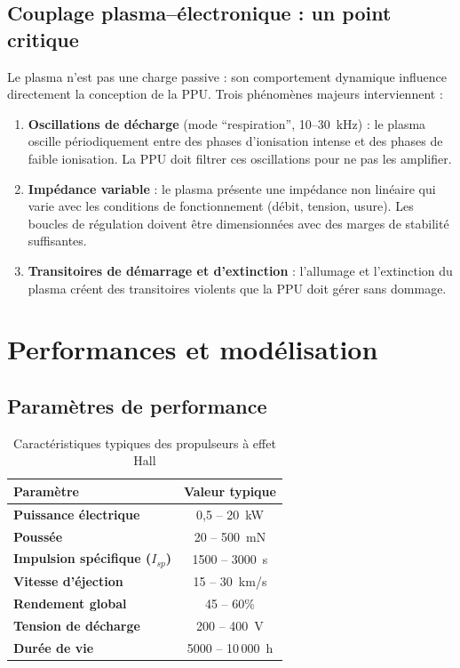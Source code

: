 \documentclass[12pt,a4paper]{article}
\begin{document}
\subsection{Couplage plasma--électronique : un point critique}

Le plasma n'est pas une charge passive : son comportement dynamique influence directement la conception de la PPU. Trois phénomènes majeurs interviennent :

\begin{enumerate}
    \item \textbf{Oscillations de décharge} (mode ``respiration'', 10--30~kHz) : le plasma oscille périodiquement entre des phases d'ionisation intense et des phases de faible ionisation. La PPU doit filtrer ces oscillations pour ne pas les amplifier.
    \item \textbf{Impédance variable} : le plasma présente une impédance non linéaire qui varie avec les conditions de fonctionnement (débit, tension, usure). Les boucles de régulation doivent être dimensionnées avec des marges de stabilité suffisantes.
    \item \textbf{Transitoires de démarrage et d'extinction} : l'allumage et l'extinction du plasma créent des transitoires violents que la PPU doit gérer sans dommage.
\end{enumerate}

\section{Performances et modélisation}

\subsection{Paramètres de performance}

\begin{table}[H]
\centering
\caption{Caractéristiques typiques des propulseurs à effet Hall}
\begin{tabular}{>{\bfseries}l c}
\toprule
Paramètre & Valeur typique \\
\midrule
Puissance électrique & 0,5 -- 20~kW \\
Poussée & 20 -- 500~mN \\
Impulsion spécifique ($I_{sp}$) & 1500 -- 3000~s \\
Vitesse d'éjection & 15 -- 30~km/s \\
Rendement global & 45 -- 60\% \\
Tension de décharge & 200 -- 400~V \\
Durée de vie & 5000 -- 10\,000~h \\
\bottomrule
\end{tabular}
\end{table}
\end{document}
